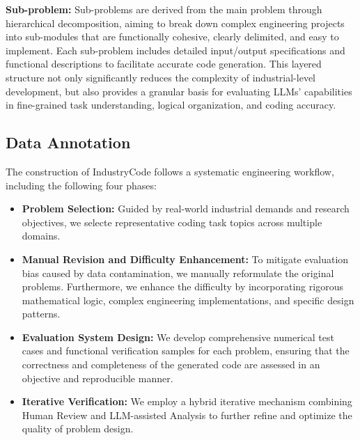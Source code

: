 \documentclass{article}
\theoremstyle{plain}
\theoremstyle{definition}
\theoremstyle{remark}
\begin{document}
\textbf{Sub-problem:}
Sub-problems are derived from the main problem through hierarchical decomposition, 
aiming to break down complex engineering projects into sub-modules that are functionally cohesive, clearly delimited, and easy to implement. 
Each sub-problem includes detailed input/output specifications and functional descriptions to facilitate accurate code generation. 
This layered structure not only significantly reduces the complexity of industrial-level development, but also provides a granular basis 
for evaluating LLMs' capabilities in fine-grained task understanding, logical organization, and coding accuracy.


\subsection{Data Annotation}

The construction of IndustryCode follows a systematic engineering workflow, including the following four phases:
\begin{itemize}

\item \textbf{Problem Selection:} Guided by real-world industrial demands and research objectives, we selecte representative coding task topics across multiple domains.
\vspace{-0.1cm}
\item \textbf{Manual Revision and Difficulty Enhancement:} To mitigate evaluation bias caused by data contamination, we manually reformulate the original problems. Furthermore, we enhance the difficulty by incorporating rigorous mathematical logic, complex engineering implementations, and specific design patterns.
\vspace{-0.1cm}
\item \textbf{Evaluation System Design:} We develop comprehensive numerical test cases and functional verification samples for each problem, ensuring that the correctness and completeness of the generated code are assessed in an objective and reproducible manner.
\vspace{-0.1cm}
\item \textbf{Iterative Verification:} We employ a hybrid iterative mechanism combining Human Review and LLM-assisted Analysis to further refine and optimize the quality of problem design.

\end{itemize}
\end{document}
